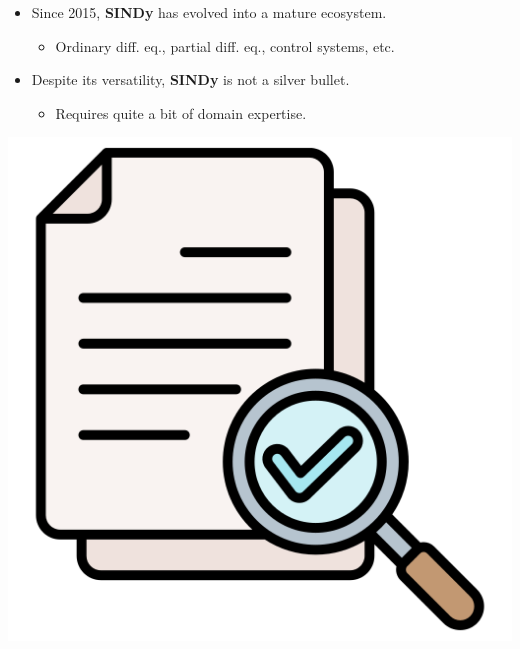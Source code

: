 \documentclass[aspectratio=169,compress,12pt]{beamer}
\begin{document}
\begin{frame}
    \vfill
    \begin{minipage}{.68\textwidth}
        \begin{itemize}
            \item Since 2015, \textbf{SINDy} has evolved into a mature ecosystem.
            \begin{itemize}
                \item Ordinary diff. eq., partial diff. eq., control systems, etc.
            \end{itemize}
            \par\bigskip
            \item Despite its versatility, \textbf{SINDy} is not a silver bullet.
            \begin{itemize}
                \item Requires quite a bit of domain expertise.
            \end{itemize}
        \end{itemize}
    \end{minipage}%
    \hfill
    \begin{minipage}{.28\textwidth}
        \centering
        \includegraphics[width=\textwidth]{imgs/conclusion.png}
    \end{minipage}
    \vfill
\end{frame}
\end{document}
